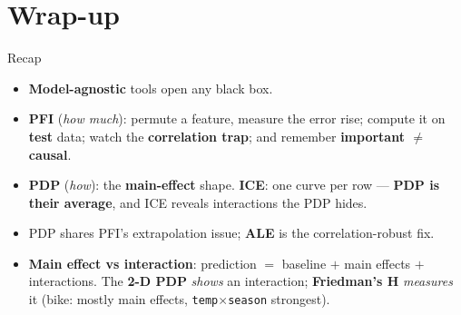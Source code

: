 \documentclass[aspectratio=169]{beamer}
\begin{document}
\section*{Wrap-up}

\begin{frame}{Recap}
  \begin{itemize}\small
    \item \textbf{Model-agnostic} tools open any black box.
    \item \textbf{PFI} (\emph{how much}): permute a feature, measure the error rise; compute it on
      \textbf{test} data; watch the \textbf{correlation trap}; and remember \textbf{important
      $\neq$ causal}.
    \item \textbf{PDP} (\emph{how}): the \textbf{main-effect} shape. \textbf{ICE}: one curve per row ---
      \textbf{PDP is their average}, and ICE reveals interactions the PDP hides.
    \item PDP shares PFI's extrapolation issue; \textbf{ALE} is the correlation-robust fix.
    \item \textbf{Main effect vs interaction}: prediction $=$ baseline $+$ main effects $+$
      interactions. The \textbf{2-D PDP} \emph{shows} an interaction; \textbf{Friedman's H}
      \emph{measures} it (bike: mostly main effects, \texttt{temp}$\times$\texttt{season} strongest).
  \end{itemize}
  \vfill
\end{frame}
\end{document}
